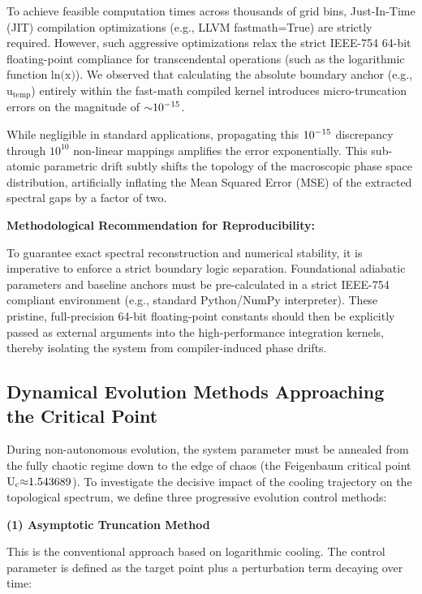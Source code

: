 \documentclass[fleqn,10pt]{wlscirep}
\begin{document}
To achieve feasible computation times across thousands of grid bins,
Just-In-Time (JIT) compilation optimizations (e.g., LLVM fastmath=True)
are strictly required. However, such aggressive optimizations relax the
strict IEEE-754 64-bit floating-point compliance for transcendental
operations (such as the logarithmic function
\(\text{ln(}\text{x}\text{)}\)). We observed that calculating the
absolute boundary anchor (e.g., \(\text{u}_{\text{temp}}\)) entirely
within the fast-math compiled kernel introduces micro-truncation errors
on the magnitude of \(\text{\ensuremath{\sim}}\text{10}^{\text{\ensuremath{-}15}}\).

While negligible in standard applications, propagating this
\(\text{10}^{\text{\ensuremath{-}15}}\) discrepancy through \(\text{10}^{\text{10}}\)
non-linear mappings amplifies the error exponentially. This sub-atomic
parametric drift subtly shifts the topology of the macroscopic phase
space distribution, artificially inflating the Mean Squared Error (MSE)
of the extracted spectral gaps by a factor of two.

\textbf{Methodological Recommendation for Reproducibility:}

To guarantee exact spectral reconstruction and numerical stability, it
is imperative to enforce a strict boundary logic separation.
Foundational adiabatic parameters and baseline anchors must be
pre-calculated in a strict IEEE-754 compliant environment (e.g.,
standard Python/NumPy interpreter). These pristine, full-precision
64-bit floating-point constants should then be explicitly passed as
external arguments into the high-performance integration kernels,
thereby isolating the system from compiler-induced phase drifts.

\subsection*{Dynamical Evolution Methods Approaching the Critical Point}

During non-autonomous evolution, the system parameter must be annealed
from the fully chaotic regime down to the edge of chaos (the Feigenbaum
critical point \(\text{U}_{\text{c}}\text{\ensuremath{\approx}1.543689}\)). To investigate
the decisive impact of the cooling trajectory on the topological
spectrum, we define three progressive evolution control methods:

\textbf{(1) Asymptotic Truncation Method}

This is the conventional approach based on logarithmic cooling. The
control parameter is defined as the target point plus a perturbation
term decaying over time:
\end{document}
